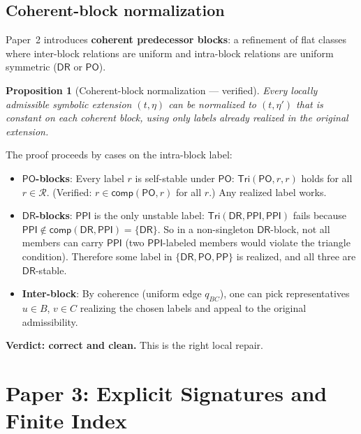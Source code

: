 \documentclass[a4paper,11pt]{article}
\newtheorem{proposition}[theorem]{Proposition}
\theoremstyle{definition}
\newcommand{\DR}{\ensuremath{\mathsf{DR}}}
\newcommand{\PO}{\ensuremath{\mathsf{PO}}}
\newcommand{\PP}{\ensuremath{\mathsf{PP}}}
\newcommand{\PPI}{\ensuremath{\mathsf{PPI}}}
\newcommand{\comp}{\ensuremath{\mathsf{comp}}}
\newcommand{\Tri}{\ensuremath{\mathsf{Tri}}}
\newcommand{\Roles}{\ensuremath{\mathcal{R}}}
\begin{document}
\subsection{Coherent-block normalization}

Paper~2 introduces \textbf{coherent predecessor blocks}: a refinement
of flat classes where inter-block relations are uniform and
intra-block relations are uniform symmetric ($\DR$ or $\PO$).

\begin{proposition}[Coherent-block normalization --- verified]
Every locally admissible symbolic extension $(t, \eta)$ can be
normalized to $(t, \eta')$ that is constant on each coherent block,
using only labels already realized in the original extension.
\end{proposition}

The proof proceeds by cases on the intra-block label:
\begin{itemize}[nosep]
\item \textbf{$\PO$-blocks}: Every label $r$ is self-stable under
  $\PO$: $\Tri(\PO, r, r)$ holds for all $r \in \Roles$.  (Verified:
  $r \in \comp(\PO, r)$ for all $r$.)  Any realized label works.

\item \textbf{$\DR$-blocks}: $\PPI$ is the only unstable label:
  $\Tri(\DR, \PPI, \PPI)$ fails because $\PPI \notin \comp(\DR, \PPI)
  = \{\DR\}$.  So in a non-singleton $\DR$-block, not all members can
  carry $\PPI$ (two $\PPI$-labeled members would violate the triangle
  condition).  Therefore some label in $\{\DR, \PO, \PP\}$ is
  realized, and all three are $\DR$-stable.

\item \textbf{Inter-block}: By coherence (uniform edge $q_{BC}$),
  one can pick representatives $u \in B$, $v \in C$ realizing the
  chosen labels and appeal to the original admissibility.
\end{itemize}

\textbf{Verdict: correct and clean.}  This is the right local repair.


\section{Paper 3: Explicit Signatures and Finite Index}
\label{sec:paper3}
\end{document}
